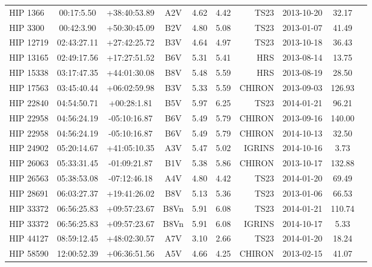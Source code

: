 \begin{scriptsize}
\begin{longtable}{lcccccrccc}
   HIP 1366 &   00:17:5.50 &  +38:40:53.89 &         A2V & 4.62 &     4.42 &       TS23 &  2013-10-20 &   32.17 \\
   HIP 3300 &   00:42:3.90 &  +50:30:45.09 &         B2V & 4.80 &     5.08 &       TS23 &  2013-01-07 &   41.49 \\
  HIP 12719 &  02:43:27.11 &  +27:42:25.72 &         B3V & 4.64 &     4.97 &       TS23 &  2013-10-18 &   36.43 \\
  HIP 13165 &  02:49:17.56 &  +17:27:51.52 &         B6V & 5.31 &     5.41 &        HRS &  2013-08-14 &   13.75 \\
  HIP 15338 &  03:17:47.35 &  +44:01:30.08 &         B8V & 5.48 &     5.59 &        HRS &  2013-08-19 &   28.50 \\
  HIP 17563 &  03:45:40.44 &  +06:02:59.98 &         B3V & 5.33 &     5.59 &     CHIRON &  2013-09-03 &  126.93 \\
  HIP 22840 &  04:54:50.71 &   +00:28:1.81 &         B5V & 5.97 &     6.25 &       TS23 &  2014-01-21 &   96.21 \\
  HIP 22958 &  04:56:24.19 &  -05:10:16.87 &         B6V & 5.49 &     5.79 &     CHIRON &  2013-09-16 &  140.00 \\
  HIP 22958 &  04:56:24.19 &  -05:10:16.87 &         B6V & 5.49 &     5.79 &     CHIRON &  2014-10-13 &   32.50 \\
  HIP 24902 &  05:20:14.67 &  +41:05:10.35 &         A3V & 5.47 &     5.02 &     IGRINS &  2014-10-16 &    3.73 \\
  HIP 26063 &  05:33:31.45 &  -01:09:21.87 &         B1V & 5.38 &     5.86 &     CHIRON &  2013-10-17 &  132.88 \\
  HIP 26563 &  05:38:53.08 &  -07:12:46.18 &         A4V & 4.80 &     4.42 &       TS23 &  2014-01-20 &   69.49 \\
  HIP 28691 &  06:03:27.37 &  +19:41:26.02 &         B8V & 5.13 &     5.36 &       TS23 &  2013-01-06 &   66.53 \\
  HIP 33372 &  06:56:25.83 &  +09:57:23.67 &        B8Vn & 5.91 &     6.08 &       TS23 &  2014-01-21 &  110.74 \\
  HIP 33372 &  06:56:25.83 &  +09:57:23.67 &        B8Vn & 5.91 &     6.08 &     IGRINS &  2014-10-17 &    5.33 \\
  HIP 44127 &  08:59:12.45 &  +48:02:30.57 &  A7V & 3.10 &     2.66 &       TS23 &  2014-01-20 &   18.24 \\
  HIP 58590 &  12:00:52.39 &  +06:36:51.56 &         A5V & 4.66 &     4.25 &     CHIRON &  2013-02-15 &   41.07 \\

\end{longtable}
\end{scriptsize}
